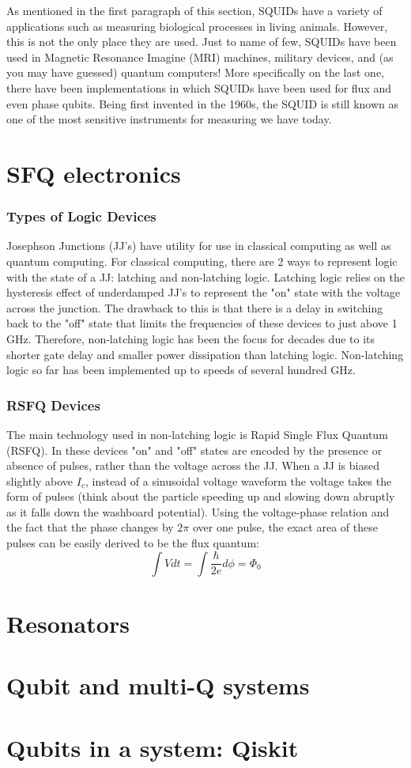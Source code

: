 \documentclass[conf]{new-aiaa}
\begin{document}
As mentioned in the first paragraph of this section, SQUIDs have a variety of applications such as measuring biological processes in living animals. However, this is not the only place they are used. Just to name of few, SQUIDs have been used in Magnetic Resonance Imagine (MRI) machines, military devices, and (as you may have guessed) quantum computers! More specifically on the last one, there have been implementations in which SQUIDs have been used for flux and even phase qubits. Being first invented in the 1960s, the SQUID is still known as one of the most sensitive instruments for measuring we have today.

\pagebreak
\section{SFQ electronics}
\subsubsection{Types of Logic Devices}
Josephson Junctions (JJ's) have utility for use in classical computing as well as quantum computing. For classical computing, there are 2 ways to represent logic with the state of a JJ: latching and non-latching logic. Latching logic relies on the hysteresis effect of underdamped JJ's to represent the "on" state with the voltage across the junction. The drawback to this is that there is a delay in switching back to the "off" state that limits the frequencies of these devices to just above 1 GHz. Therefore, non-latching logic has been the focus for decades due to its shorter gate delay and smaller power dissipation than latching logic. Non-latching logic so far has been implemented up to speeds of several hundred GHz. 
\subsubsection{RSFQ Devices}
The main technology used in non-latching logic is Rapid Single Flux Quantum (RSFQ). In these devices "on" and "off" states are encoded by the presence or absence of pulses, rather than the voltage across the JJ. When a JJ is biased slightly above $I_c$, instead of a sinusoidal voltage waveform the voltage takes the form of pulses (think about the particle speeding up and slowing down abruptly as it falls down the washboard potential). Using the voltage-phase relation and the fact that the phase changes by $2\pi$ over one pulse, the exact area of these pulses can be easily derived to be the flux quantum:
$$\int V dt = \int \frac{\hbar}{2e} d\phi = \Phi_0$$

\pagebreak
\section{Resonators}
\pagebreak
\section{Qubit and multi-Q systems}
\pagebreak
\section {Qubits in a system: Qiskit}



\nocite{*}

\end{document}
